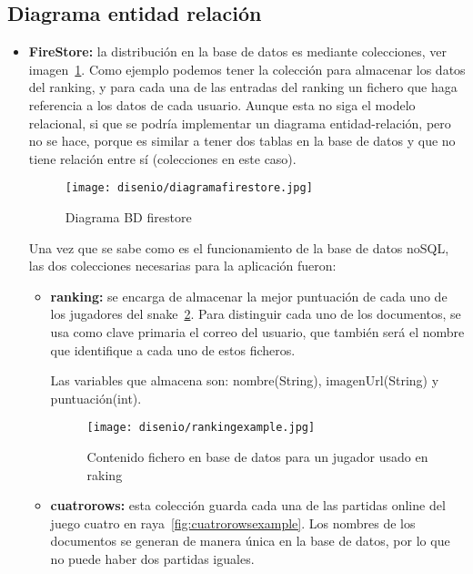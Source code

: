\subsection{Diagrama entidad relación}
\begin{itemize}
	\item \textbf{FireStore:} la distribución en la base de datos es mediante colecciones, ver imagen~\ref{fig:diagramfirestore}. Como ejemplo podemos tener la colección para almacenar los datos del ranking, y para cada una de las entradas del ranking un fichero  que haga referencia a los datos de cada usuario. Aunque esta no siga el modelo relacional, si que se podría implementar un diagrama entidad-relación, pero no se hace, porque es similar a tener dos tablas en la base de datos y que no tiene relación entre sí  (colecciones en este caso).
	
	\begin{figure}[H]
		\centering
		\texttt{[image: disenio/diagramafirestore.jpg]}
		\caption{Diagrama BD firestore}\label{fig:diagramfirestore}
	\end{figure}

	Una vez que se sabe como es el funcionamiento de la base de datos noSQL, las dos colecciones necesarias para la aplicación fueron:
	
	\begin{itemize}
		\item \textbf{ranking:} se encarga de almacenar la mejor puntuación de cada uno de los jugadores del snake~\ref{fig:rankingexample}. Para distinguir cada uno de los documentos, se usa como clave primaria el correo del usuario, que también será el nombre que identifique a cada uno de estos ficheros.
		
		Las variables que almacena son: nombre(String), imagenUrl(String) y puntuación(int). 
		
		\begin{figure}[H]
			\centering
			\texttt{[image: disenio/rankingexample.jpg]}
			\caption{Contenido fichero en base de datos para un jugador usado en raking}\label{fig:rankingexample}
		\end{figure}
	
		\item \textbf{cuatrorows:} esta colección guarda cada una de las partidas online del juego cuatro en raya~\ref{fig:cuatrorowsexample}. Los nombres de los documentos se generan de manera única en la base de datos, por lo que no puede haber dos partidas iguales.
		

\end{itemize}
\end{itemize}
